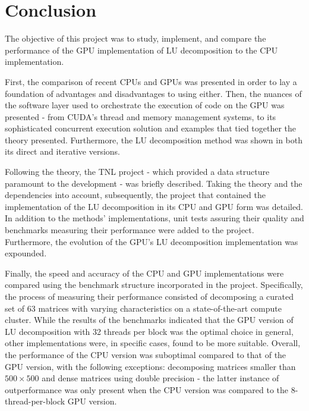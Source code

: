 \chapter*{Conclusion}				   	   %

The objective of this project was to study, implement, and compare the performance of the GPU implementation of LU decomposition to the CPU implementation.
\par First, the comparison of recent CPUs and GPUs was presented in order to lay a foundation of advantages and disadvantages to using either. Then, the nuances of the software layer used to orchestrate the execution of code on the GPU was presented - from CUDA's thread and memory management systems, to its sophisticated concurrent execution solution and examples that tied together the theory presented. Furthermore, the LU decomposition method was shown in both its direct and iterative versions.
\par Following the theory, the TNL project - which provided a data structure paramount to the development - was briefly described. Taking the theory and the dependencies into account, subsequently, the project that contained the implementation of the LU decomposition in its CPU and GPU form was detailed. In addition to the methods' implementations, unit tests assuring their quality and benchmarks measuring their performance were added to the project. Furthermore, the evolution of the GPU's LU decomposition implementation was expounded.
\par Finally, the speed and accuracy of the CPU and GPU implementations were compared using the benchmark structure incorporated in the project. Specifically, the process of measuring their performance consisted of decomposing a curated set of 63 matrices with varying characteristics on a state-of-the-art compute cluster. While the results of the benchmarks indicated that the GPU version of LU decomposition with 32 threads per block was the optimal choice in general, other implementations were, in specific cases, found to be more suitable. Overall, the performance of the CPU version was suboptimal compared to that of the GPU version, with the following exceptions: decomposing matrices smaller than $ 500\times 500 $ and dense matrices using double precision - the latter instance of outperformance was only present when the CPU version was compared to the 8-thread-per-block GPU version.
